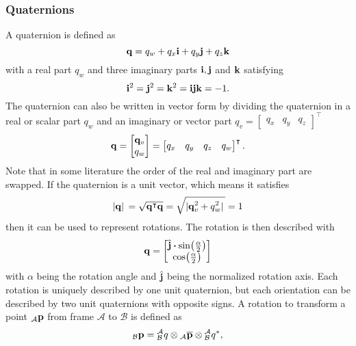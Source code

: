 \subsubsection{Quaternions}
A quaternion is defined as
\begin{equation}
	\vb{q} = q_w + q_x\vb{i} + q_y\vb{j} + q_z\vb{k}
\end{equation}
with a real part $q_w$ and three imaginary parts $\vb{i}, \vb{j}$ and $\vb{k}$ satisfying
\begin{equation}
	\vb{i}^2 = \vb{j}^2 = \vb{k}^2 = \vb{i}\vb{j}\vb{k} = -1.
\end{equation}
The quaternion can also be written in vector form by dividing the quaternion in a real or scalar part $q_w$ and an imaginary or vector part $q_v = \begin{bmatrix} q_x & q_y & q_z	\end{bmatrix}^\intercal$
\begin{equation}
	\vb{q} = \begin{bmatrix}
		\vb{q}_v \\
		q_w
	\end{bmatrix}
	=\begin{bmatrix}
		q_x & q_y & q_z & q_w
	\end{bmatrix}^\intercal.
\end{equation}
Note that in some literature the order of the real and imaginary part are swapped.
If the quaternion is a unit vector, which means it satisfies
\begin{equation}
	\abs*{\vb{q}} = \sqrt{\vb{q}^\intercal \vb{q}} = \sqrt{\abs*{\vb{q}_v^2 + q_w^2}} = 1
\end{equation}
then it can be used to represent rotations.
The rotation is then described with
\begin{equation}
	\label{eq:quaternion}
	\vb{q} =
	\begin{bmatrix}
		\hat{\vb{j}}\vdot\sin(\frac{\alpha}{2}) \\
		\cos(\frac{\alpha}{2})
	\end{bmatrix}
\end{equation}
with $\alpha$ being the rotation angle and $\hat{\vb{j}}$ being the normalized rotation axis.
Each rotation is uniquely described by one unit quaternion, but each orientation can be described by two unit quaternions with opposite signs.
A rotation to transform a point ${}_\mathcal{A}\vb{p}$ from frame $\mathcal{A}$ to $\mathcal{B}$ is defined as
\begin{equation}
	{}_\mathcal{B}\vb{p} = \qtf{a}{b} \otimes {}_\mathcal{A}\overline{\vb{p}} \otimes \qtf{a}{b}^*,
\end{equation}

